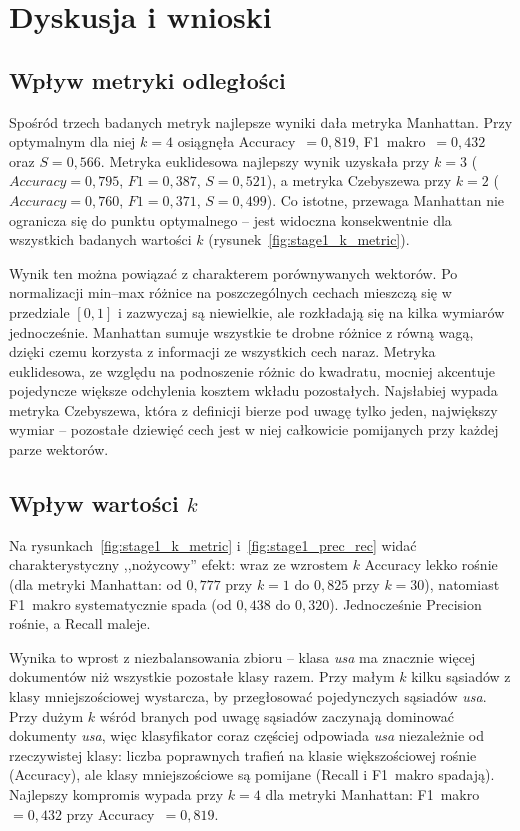 \documentclass{article}
\begin{document}
\section{Dyskusja i wnioski}

\subsection{Wpływ metryki odległości}

Spośród trzech badanych metryk najlepsze wyniki dała metryka Manhattan.
Przy optymalnym dla niej $k=4$ osiągnęła Accuracy~$=0{,}819$, F1~makro~$=0{,}432$
oraz $S=0{,}566$. Metryka euklidesowa najlepszy wynik uzyskała przy $k=3$
($Accuracy=0{,}795$, $F1=0{,}387$, $S=0{,}521$), a metryka Czebyszewa przy $k=2$
($Accuracy=0{,}760$, $F1=0{,}371$, $S=0{,}499$). Co istotne, przewaga Manhattan
nie ogranicza się do punktu optymalnego -- jest widoczna konsekwentnie dla
wszystkich badanych wartości $k$ (rysunek~\ref{fig:stage1_k_metric}).

Wynik ten można powiązać z charakterem porównywanych wektorów. Po normalizacji
min--max różnice na poszczególnych cechach mieszczą się w przedziale $[0,1]$
i zazwyczaj są niewielkie, ale rozkładają się na kilka wymiarów jednocześnie.
Manhattan sumuje wszystkie te drobne różnice z równą wagą, dzięki czemu
korzysta z informacji ze wszystkich cech naraz. Metryka euklidesowa, ze względu
na podnoszenie różnic do kwadratu, mocniej akcentuje pojedyncze większe
odchylenia kosztem wkładu pozostałych. Najsłabiej wypada metryka Czebyszewa,
która z definicji bierze pod uwagę tylko jeden, największy wymiar -- pozostałe
dziewięć cech jest w niej całkowicie pomijanych przy każdej parze wektorów.

\subsection{Wpływ wartości $k$}

Na rysunkach~\ref{fig:stage1_k_metric} i~\ref{fig:stage1_prec_rec} widać
charakterystyczny ,,nożycowy'' efekt: wraz ze wzrostem $k$ Accuracy lekko
rośnie (dla metryki Manhattan: od $0{,}777$ przy $k=1$ do $0{,}825$ przy
$k=30$), natomiast F1~makro systematycznie spada (od $0{,}438$ do $0{,}320$).
Jednocześnie Precision rośnie, a Recall maleje.

Wynika to wprost z niezbalansowania zbioru -- klasa \textit{usa} ma znacznie
więcej dokumentów niż wszystkie pozostałe klasy razem. Przy małym $k$ kilku
sąsiadów z klasy mniejszościowej wystarcza, by przegłosować pojedynczych
sąsiadów \textit{usa}. Przy dużym $k$ wśród branych pod uwagę sąsiadów zaczynają
dominować dokumenty \textit{usa}, więc klasyfikator coraz częściej odpowiada
\textit{usa} niezależnie od rzeczywistej klasy: liczba poprawnych trafień na
klasie większościowej rośnie (Accuracy), ale klasy mniejszościowe są pomijane
(Recall i F1~makro spadają). Najlepszy kompromis wypada przy $k=4$ dla metryki
Manhattan: F1~makro~$=0{,}432$ przy Accuracy~$=0{,}819$.
\end{document}

